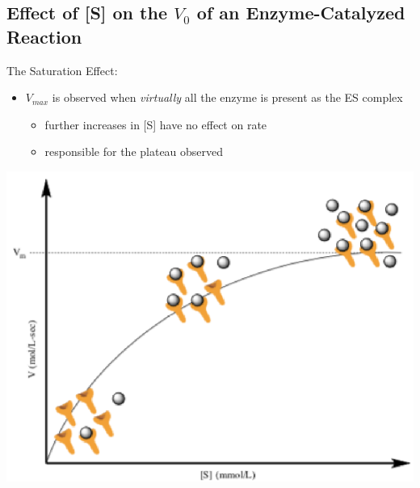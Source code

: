 \documentclass[10pt]{article}
\begin{document}
\subsection*{Effect of [S] on the $V_0$ of an Enzyme-Catalyzed Reaction}
The Saturation Effect:
\begin{itemize}
    \item $V_{max}$ is observed when \textit{virtually} all the enzyme is present as the ES complex
    \begin{itemize}
        \item further increases in [S] have no effect on rate
        \item responsible for the plateau observed
    \end{itemize}
\end{itemize}
\begin{center}
    \includegraphics*[scale=0.5]{L1_6.png}
\end{center}
\end{document}
